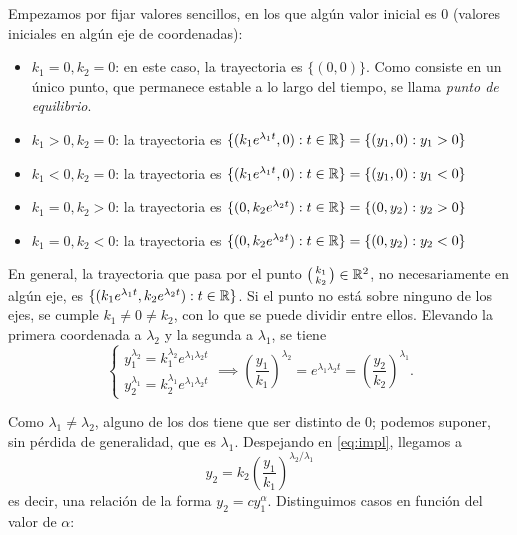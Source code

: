 \documentclass[../ecuaciones_diferenciales.tex]{subfiles}
\begin{document}
Empezamos por fijar valores sencillos, en los que algún valor inicial es 0
(valores iniciales en algún eje de coordenadas):
\begin{itemize}
	\item \(k_1 = 0, k_2 = 0\): en este caso, la trayectoria es \(\{(0,0)\}\). Como
	      consiste en un único punto, que permanece estable a lo largo del tiempo, se
	      llama \emph{punto de equilibrio}.

	\item \(k_1 > 0, k_2 = 0\): la trayectoria es \(\{(k_1e^{\lambda_1 t}, 0) : t \in
	      \mathbb{R}\} = \{(y_1, 0) : y_1 > 0\}\)

	\item \(k_1 < 0, k_2 = 0\): la trayectoria es \(\{(k_1e^{\lambda_1 t}, 0) : t \in
	      \mathbb{R}\} = \{(y_1, 0) : y_1 < 0\}\)

	\item \(k_1 = 0, k_2 > 0\): la trayectoria es \(\{(0, k_2e^{\lambda_2 t}) : t
	      \in \mathbb{R}\} = \{(0,y_2) : y_2 > 0\}\)

	\item \(k_1 = 0, k_2 < 0\): la trayectoria es \(\{(0, k_2e^{\lambda_2 t}) : t
	      \in \mathbb{R}\} = \{(0,y_2) : y_2 < 0\}\)
\end{itemize}

En general, la trayectoria que pasa por el punto \(\smat{k_1 \\ k_2} \in \R^2\),
no necesariamente en algún eje, es
\(\{(k_1e^{\lambda_1 t}, k_2e^{\lambda_2 t}) : t \in \mathbb{R}\}\). Si el punto no está
sobre ninguno de los ejes, se cumple \(k_1 \neq 0 \neq k_2\), con lo que se
puede dividir entre ellos. Elevando la primera coordenada a \(\lambda_2\) y la
segunda a \(\lambda_1\), se tiene
\begin{equation}\label{eq:impl}
	\begin{cases}
		y_1^{\lambda_2} = k_1^{\lambda_2}e^{\lambda_1\lambda_2 t} \\
		y_2^{\lambda_1} = k_2^{\lambda_1}e^{\lambda_1\lambda_2 t}
	\end{cases} \implies \left(\frac{y_1}{k_1}\right)^{\lambda_2} = e^{\lambda_1
			\lambda_2 t} = \left(\frac{y_2}{k_2}\right)^{\lambda_1}.
\end{equation}

Como \(\lambda_1 \neq \lambda_2\), alguno de los dos tiene que ser distinto de
0; podemos suponer, sin pérdida de generalidad, que es \(\lambda_1\). Despejando
en \eqref{eq:impl}, llegamos a
\[y_2 = k_2 \left(\frac{y_1}{k_1}\right)^{\lambda_2 / \lambda_1}\]
es decir, una relación de la forma \(y_2 = c y_1^\alpha\). Distinguimos casos en
función del valor de \(\alpha\):
\end{document}
